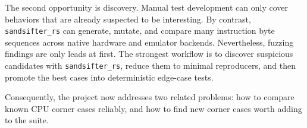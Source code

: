 The second opportunity is discovery. Manual test development can only cover behaviors that are already suspected to be interesting. By contrast, \texttt{sandsifter\_rs} can generate, mutate, and compare many instruction byte sequences across native hardware and emulator backends. Nevertheless, fuzzing findings are only leads at first. The strongest workflow is to discover suspicious candidates with \texttt{sandsifter\_rs}, reduce them to minimal reproducers, and then promote the best cases into deterministic edge-case tests.

Consequently, the project now addresses two related problems: how to compare known CPU corner cases reliably, and how to find new corner cases worth adding to the suite.
